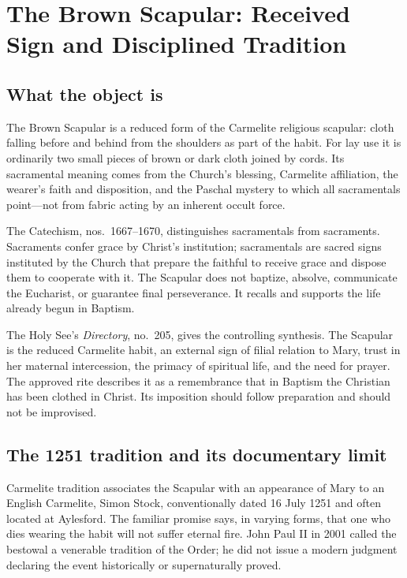 \section{The Brown Scapular: Received Sign and Disciplined Tradition}

\subsection{What the object is}

The Brown Scapular is a reduced form of the Carmelite religious scapular: cloth falling before and behind from the shoulders as part of the habit. For lay use it is ordinarily two small pieces of brown or dark cloth joined by cords. Its sacramental meaning comes from the Church's blessing, Carmelite affiliation, the wearer's faith and disposition, and the Paschal mystery to which all sacramentals point---not from fabric acting by an inherent occult force.

The Catechism, nos.~1667--1670, distinguishes sacramentals from sacraments. Sacraments confer grace by Christ's institution; sacramentals are sacred signs instituted by the Church that prepare the faithful to receive grace and dispose them to cooperate with it. The Scapular does not baptize, absolve, communicate the Eucharist, or guarantee final perseverance. It recalls and supports the life already begun in Baptism.

The Holy See's \textit{Directory}, no.~205, gives the controlling synthesis. The Scapular is the reduced Carmelite habit, an external sign of filial relation to Mary, trust in her maternal intercession, the primacy of spiritual life, and the need for prayer. The approved rite describes it as a remembrance that in Baptism the Christian has been clothed in Christ. Its imposition should follow preparation and should not be improvised.

\subsection{The 1251 tradition and its documentary limit}

Carmelite tradition associates the Scapular with an appearance of Mary to an English Carmelite, Simon Stock, conventionally dated 16 July 1251 and often located at Aylesford. The familiar promise says, in varying forms, that one who dies wearing the habit will not suffer eternal fire. John Paul II in 2001 called the bestowal a venerable tradition of the Order; he did not issue a modern judgment declaring the event historically or supernaturally proved.

